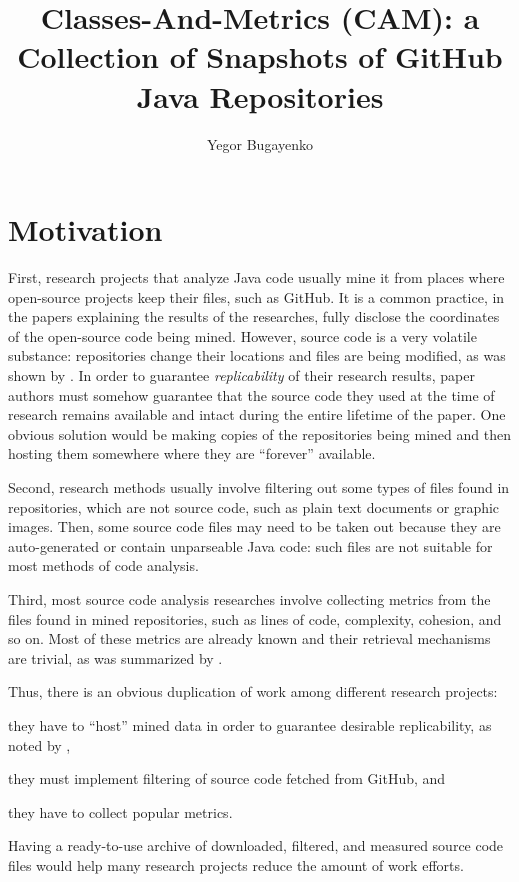 \documentclass[10pt,sigplan,nonacm,natbib=false]{acmart}
\title{Classes-And-Metrics (CAM): a Collection of Snapshots of GitHub Java Repositories}
\author{Yegor Bugayenko}
\affiliation{\institution{Huawei, Russia, Moscow}\city{}\country{}}
\begin{document}
\maketitle

\section*{Motivation}

First, research projects that analyze Java code usually mine it from places where open-source projects keep their files, such as GitHub. It is a common practice, in the papers explaining the results of the researches, fully disclose the coordinates of the open-source code being mined. However, source code is a very volatile substance: repositories change their locations and files are being modified, as was shown by \citet{5463348}. In order to guarantee \emph{replicability} of their research results, paper authors must somehow guarantee that the source code they used at the time of research remains available and intact during the entire lifetime of the paper. One obvious solution would be making copies of the repositories being mined and then hosting them somewhere where they are ``forever'' available.

Second, research methods usually involve filtering out some types of files found in repositories, which are not source code, such as plain text documents or graphic images. Then, some source code files may need to be taken out because they are auto-generated or contain unparseable Java code: such files are not suitable for most methods of code analysis.

Third, most source code analysis researches involve collecting metrics from the files found in mined repositories, such as lines of code, complexity, cohesion, and so on. Most of these metrics are already known and their retrieval mechanisms are trivial, as was summarized by \citet{nunez2017source}.

Thus, there is an obvious duplication of work among different research projects:
\begin{inparaenum}[(a)]
\item they have to ``host'' mined data in order to guarantee desirable replicability, as noted by \citet{7887704},
\item they must implement filtering of source code fetched from GitHub,
and
\item they have to collect popular metrics.
\end{inparaenum}
Having a ready-to-use archive of downloaded, filtered, and measured source code files would help many research projects reduce the amount of work efforts.
\end{document}
